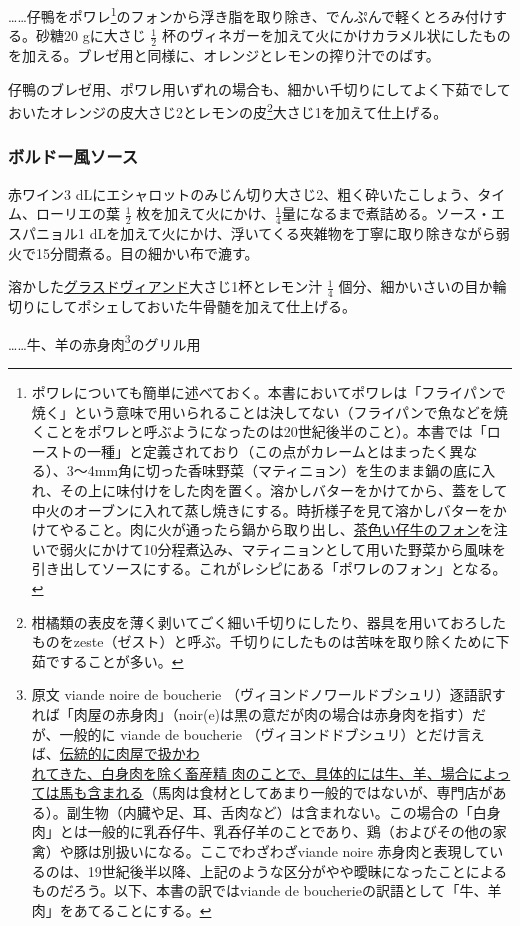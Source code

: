 \begin{recette}
\ldots{}\ldots{}仔鴨をポワレ\footnote{ポワレについても簡単に述べておく。本書においてポワレは「フライパンで焼く」という意味で用いられることは決してない（フライパンで魚などを焼くことをポワレと呼ぶようになったのは20世紀後半のこと）。本書では「ローストの一種」と定義されており（この点がカレームとはまったく異なる）、3〜4mm角に切った香味野菜（マティニョン）を生のまま鍋の底に入れ、その上に味付けをした肉を置く。溶かしバターをかけてから、蓋をして中火のオーブンに入れて蒸し焼きにする。時折様子を見て溶かしバターをかけてやること。肉に火が通ったら鍋から取り出し、\protect\hyperlink{jus-de-veau-brun}{茶色い仔牛のフォン}を注いで弱火にかけて10分程煮込み、マティニョンとして用いた野菜から風味を引き出してソースにする。これがレシピにある「ポワレのフォン」となる。}のフォンから浮き脂を取り除き、でんぷんで軽くとろみ付けする。砂糖20
gに大さじ \(\frac{1}{2}\)
杯のヴィネガーを加えて火にかけカラメル状にしたものを加える。ブレゼ用と同様に、オレンジとレモンの搾り汁でのばす。

仔鴨のブレゼ用、ポワレ用いずれの場合も、細かい千切りにしてよく下茹でしておいたオレンジの皮大さじ2とレモンの皮\footnote{柑橘類の表皮を薄く剥いてごく細い千切りにしたり、器具を用いておろしたものをzeste（ゼスト）と呼ぶ。千切りにしたものは苦味を取り除くために下茹ですることが多い。}大さじ1を加えて仕上げる。

\hypertarget{sauce-bordelaise}{%
\subsubsection{ボルドー風ソース}\label{sauce-bordelaise}}



赤ワイン3
dLにエシャロットのみじん切り大さじ2、粗く砕いたこしょう、タイム、ローリエの葉
\(\frac{1}{2}\)
枚を加えて火にかけ、\(\frac{1}{4}\)量になるまで煮詰める。ソース・エスパニョル1
dLを加えて火にかけ、浮いてくる夾雑物を丁寧に取り除きながら弱火で15分間煮る。目の細かい布で漉す。

溶かした\protect\hyperlink{glace-de-viande}{グラスドヴィアンド}大さじ1杯とレモン汁
\(\frac{1}{4}\)
個分、細かいさいの目か輪切りにしてポシェしておいた牛骨髄を加えて仕上げる。

\ldots{}\ldots{}牛、羊の赤身肉\footnote{原文 viande noire de boucherie
  （ヴィヨンドノワールドブシュリ）逐語訳すれば「肉屋の赤身肉」（noir(e)は黒の意だが肉の場合は赤身肉を指す）だが、一般的に
  viande de boucherie
  （ヴィヨンドドブシュリ）とだけ言えば、\ul{伝統的に肉屋で扱かわ\\れてきた、白身肉を除く畜産精
  肉のことで、具体的には牛、羊、場合によっては馬も含まれる}（馬肉は食材としてあまり一般的ではないが、専門店がある）。副生物（内臓や足、耳、舌肉など）は含まれない。この場合の「白身肉」とは一般的に乳呑仔牛、乳呑仔羊のことであり、鶏（およびその他の家禽）や豚は別扱いになる。ここでわざわざviande
  noire
  赤身肉と表現しているのは、19世紀後半以降、上記のような区分がやや曖昧になったことによるものだろう。以下、本書の訳ではviande
  de boucherieの訳語として「牛、羊肉」をあてることにする。}のグリル用


\end{recette}
